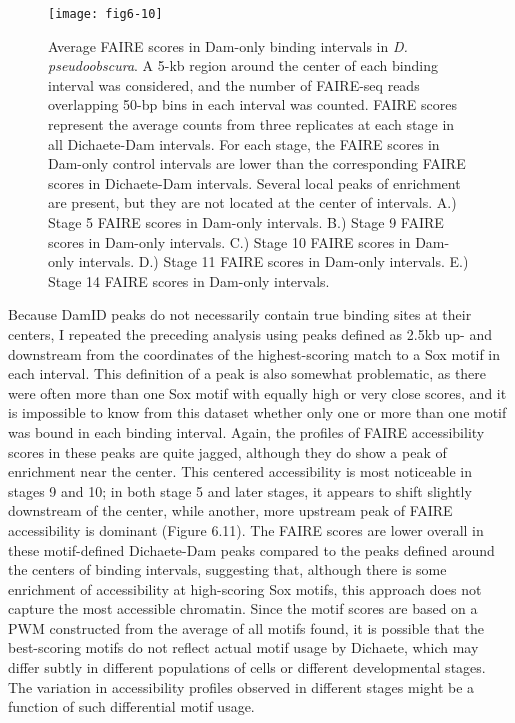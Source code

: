 \begin{figure}
\centering
\texttt{[image: fig6-10]}
\caption[Average FAIRE scores in Dam-only binding intervals in \emph{D. pseudoobscura}]{Average FAIRE scores in Dam-only binding intervals in \emph{D. pseudoobscura}. A 5-kb region around the center of each binding interval was considered, and the number of FAIRE-seq reads overlapping 50-bp bins in each interval was counted. FAIRE scores represent the average counts from three replicates at each stage in all Dichaete-Dam intervals. For each stage, the FAIRE scores in Dam-only control intervals are lower than the corresponding FAIRE scores in Dichaete-Dam intervals. Several local peaks of enrichment are present, but they are not located at the center of intervals. A.) Stage 5 FAIRE scores in Dam-only intervals. B.) Stage 9 FAIRE scores in Dam-only intervals. C.) Stage 10 FAIRE scores in Dam-only intervals. D.) Stage 11 FAIRE scores in Dam-only intervals. E.) Stage 14 FAIRE scores in Dam-only intervals.}
\label{Figure 6.10}
\end{figure}

Because DamID peaks do not necessarily contain true binding sites at their centers, I repeated the preceding analysis using peaks defined as 2.5kb up- and downstream from the coordinates of the highest-scoring match to a Sox motif in each interval. This definition of a peak is also somewhat problematic, as there were often more than one Sox motif with equally high or very close scores, and it is impossible to know from this dataset whether only one or more than one motif was bound in each binding interval. Again, the profiles of FAIRE accessibility scores in these peaks are quite jagged, although they do show a peak of enrichment near the center. This centered accessibility is most noticeable in stages 9 and 10; in both stage 5 and later stages, it appears to shift slightly downstream of the center, while another, more upstream peak of FAIRE accessibility is dominant (Figure 6.11). The FAIRE scores are lower overall in these motif-defined Dichaete-Dam peaks compared to the peaks defined around the centers of binding intervals, suggesting that, although there is some enrichment of accessibility at high-scoring Sox motifs, this approach does not capture the most accessible chromatin. Since the motif scores are based on a PWM constructed from the average of all motifs found, it is possible that the best-scoring motifs do not reflect actual motif usage by Dichaete, which may differ subtly in different populations of cells or different developmental stages. The variation in accessibility profiles observed in different stages might be a function of such differential motif usage.

